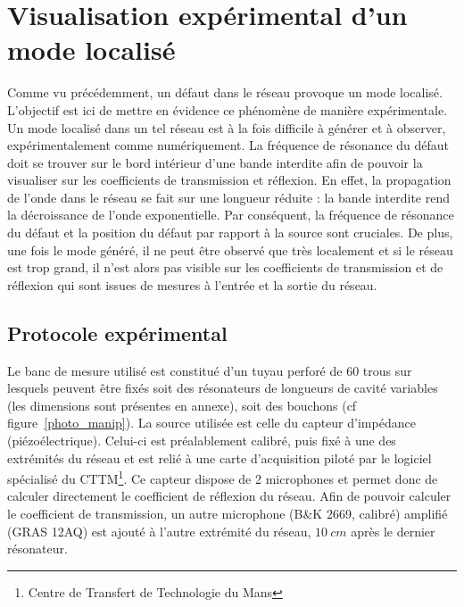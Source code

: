 \chapter{Visualisation expérimental d'un mode localisé}
Comme vu précédemment, un défaut dans le réseau provoque un mode localisé. L'objectif est ici de mettre en évidence ce phénomène de manière expérimentale.\\


Un mode localisé dans un tel réseau est à la fois difficile à générer et à observer, expérimentalement comme numériquement. La fréquence de résonance du défaut doit se trouver sur le bord intérieur d'une bande interdite afin de pouvoir la visualiser sur les coefficients de transmission et réflexion. En effet, la propagation de l'onde dans le réseau se fait sur une longueur réduite : la bande interdite rend la décroissance de l'onde exponentielle. Par conséquent, la fréquence de résonance du défaut et la position du défaut par rapport à la source sont cruciales. De plus, une fois le mode généré, il ne peut être observé que très localement et si le réseau est trop grand, il n'est alors pas visible sur les coefficients de transmission et de réflexion qui sont issues de mesures à l'entrée et la sortie du réseau.


\section{Protocole expérimental}
Le banc de mesure utilisé est constitué d'un tuyau perforé de 60 trous sur lesquels peuvent être fixés soit des résonateurs de longueurs de cavité variables (les dimensions sont présentes en annexe), soit des bouchons (cf figure~\ref{photo_manip}). La source utilisée est celle du capteur d'impédance (piézoélectrique). Celui-ci est préalablement calibré, puis fixé à une des extrémités du réseau et est relié à une carte d'acquisition piloté par le logiciel spécialisé du CTTM\footnote{Centre de Transfert de Technologie du Mans}. Ce capteur dispose de 2 microphones et permet donc de calculer directement le coefficient de réflexion du réseau. Afin de pouvoir calculer le coefficient de transmission, un autre microphone (B\&K 2669, calibré) amplifié (GRAS 12AQ) est ajouté à l'autre extrémité du réseau, $10~cm$ après le dernier résonateur.


